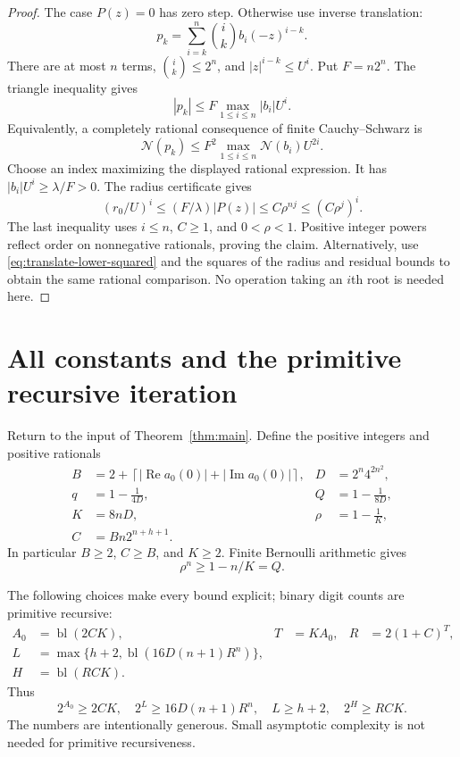 \documentclass[11pt,letterpaper]{article}
\theoremstyle{definition}\newtheorem{definition}[theorem]{Definition}
\theoremstyle{remark}\newtheorem{remark}[theorem]{Remark}
\newcommand{\nn}[1]{\mathcal N(#1)}
\newcommand{\ceil}[1]{\left\lceil#1\right\rceil}
\newcommand{\bl}{\operatorname{bl}}
\newcommand{\re}{\operatorname{Re}}\newcommand{\im}{\operatorname{Im}}
\begin{document}
\begin{proof}
The case $P(z)=0$ has zero step. Otherwise use inverse translation:
\begin{equation}
 p_k=\sum_{i=k}^n\binom ik b_i(-z)^{i-k}.
 \label{eq:inverse-translation}
\end{equation}
There are at most $n$ terms, $\binom ik\le2^n$, and
$|z|^{i-k}\le U^i$. Put $F=n2^n$. The triangle inequality gives
\begin{equation}
 |p_k|\le F\max_{1\le i\le n}|b_i|U^i.
 \label{eq:translate-lower}
\end{equation}
Equivalently, a completely rational consequence of finite Cauchy--Schwarz is
\begin{equation}
 \nn{p_k}\le F^2\max_{1\le i\le n}\nn{b_i}U^{2i}.
 \label{eq:translate-lower-squared}
\end{equation}
Choose an index maximizing the displayed rational expression. It has
$|b_i|U^i\ge\lambda/F>0$. The radius certificate gives
\[
 (r_0/U)^i\le(F/\lambda)|P(z)|
       \le C\rho^{nj}\le(C\rho^j)^i.
\]
The last inequality uses $i\le n$, $C\ge1$, and $0<\rho<1$.
Positive integer powers reflect order on nonnegative rationals, proving
the claim. Alternatively, use \eqref{eq:translate-lower-squared} and the
squares of the radius and residual bounds to obtain the same rational
comparison. No operation taking an $i$th root is needed here.
\end{proof}

\section{All constants and the primitive recursive iteration}
\label{sec:iteration}

Return to the input of Theorem~\ref{thm:main}. Define the positive integers
and positive rationals
\begin{align}
 B&=2+\ceil{|\re a_0(0)|+|\im a_0(0)|},
 &D&=2^n4^{2n^2},\nonumber\\
 q&=1-\frac1{4D},&Q&=1-\frac1{8D},\nonumber\\
 K&=8nD,&\rho&=1-\frac1K,\nonumber\\
 C&=Bn2^{n+h+1}.&&
 \label{eq:constants}
\end{align}
In particular $B\ge2$, $C\ge B$, and $K\ge2$.
Finite Bernoulli arithmetic gives
\begin{equation}
 \rho^n\ge1-n/K=Q.
 \label{eq:rho-q}
\end{equation}

The following choices make every bound explicit; binary digit counts are
primitive recursive:
\begin{align}
 A_0&=\bl(2CK),&T&=KA_0,&R&=2(1+C)^T,
 \label{eq:radius-global}\\
 L&=\max\{h+2,\bl(16D(n+1)R^n)\},&&&
 \label{eq:precision-global}\\
 H&=\bl(RCK).&&&
 \label{eq:H}
\end{align}
Thus
\[
 2^{A_0}\ge2CK,\quad 2^L\ge16D(n+1)R^n,
 \quad L\ge h+2,\quad 2^H\ge RCK.
\]
The numbers are intentionally generous. Small asymptotic complexity is not
needed for primitive recursiveness.
\end{document}
